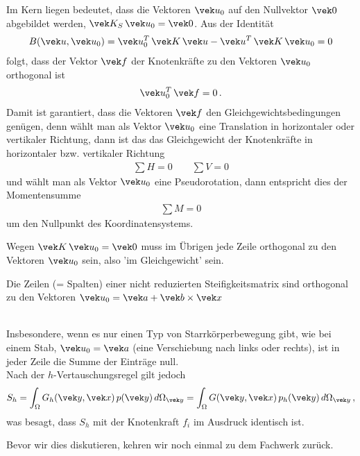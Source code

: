 {Im Kern liegen bedeutet, dass die Vektoren $\vek u_0 $ auf den Nullvektor $\vek 0$ abgebildet werden, $\vek K_S\,\vek u_0 = \vek 0$. Aus der Identit\"{a}t
\begin{align}
B(\vek u,\vek u_0) = \vek u_0^T\,\vek K\,\vek u - \vek u^T\,\vek K\,\vek u_0 = 0
\end{align}
folgt, dass der Vektor $\vek f$ der Knotenkr\"{a}fte zu den Vektoren $\vek u_0 $ orthogonal ist
\begin{align}
\vek u_0^T \,\vek f = 0\,.
\end{align}
Damit ist garantiert, dass die Vektoren $\vek f $ den Gleichgewichtsbedingungen gen\"{u}gen, denn w\"{a}hlt man als Vektor $\vek u_0$ eine Translation in horizontaler oder vertikaler Richtung, dann ist das das Gleichgewicht der Knotenkr\"{a}fte in horizontaler bzw. vertikaler Richtung
\begin{align}
\sum H = 0 \qquad \sum V = 0
\end{align}
 und w\"{a}hlt man als Vektor $\vek u_0 $ eine Pseudorotation, dann entspricht dies der Momentensumme
\begin{align}
\sum M = 0
\end{align}
um den Nullpunkt des Koordinatensystems.

Wegen $\vek K\,\vek u_0 = \vek 0$ muss im \"{U}brigen jede Zeile orthogonal zu den Vektoren $\vek u_0$ sein, also 'im Gleichgewicht' sein.\\


\hspace*{-12pt}\colorbox{hellgrau}{\parbox{0.98\textwidth}{Die Zeilen (= Spalten) einer nicht reduzierten Steifigkeitsmatrix sind orthogonal zu den Vektoren $\vek u_0 = \vek  a + \vek b \times \vek x$}}\\

Insbesondere, wenn es nur einen Typ von Starrk\"{o}rperbewegung gibt, wie bei einem Stab, $\vek u_0 = \vek a$ (eine Verschiebung nach links oder rechts), ist in jeder Zeile die Summe der Eintr\"{a}ge null.\\

Nach der $h$-Vertauschungsregel gilt jedoch
\begin{align}
S_h  = \int_{\Omega} G_h(\vek y,\vek x)\,p(\vek y)\,d\Omega_{\vek y} =  \int_{\Omega} G(\vek y,\vek x)\,p_h(\vek y)\,d\Omega_{\vek y}\,,
\end{align}
was besagt, dass $S_h$ mit der Knotenkraft $f_i$ im Ausdruck identisch ist.

Bevor wir dies diskutieren, kehren wir noch einmal zu dem Fachwerk zur\"{u}ck.\\

}
